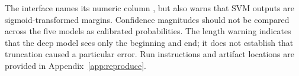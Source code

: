 
The interface names its numeric column , but also warns that
SVM outputs are sigmoid-transformed margins. Confidence magnitudes should not
be compared across the five models as calibrated probabilities. The length
warning indicates that the deep model sees only the beginning and end; it does
not establish that truncation caused a particular error. Run instructions and
artifact locations are provided in Appendix~\ref{app:reproduce}.
\FloatBarrier

